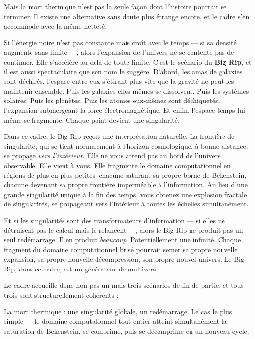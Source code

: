 \documentclass[11pt, twoside, openright]{book}
\begin{document}
Mais la mort thermique n'est pas la seule façon dont l'histoire pourrait se terminer. Il existe une alternative sans doute plus étrange encore, et le cadre s'en accommode avec la même netteté.

Si l'énergie noire n'est pas constante mais croît avec le temps --- si sa densité augmente sans limite ---, alors l'expansion de l'univers ne se contente pas de continuer. Elle s'accélère au-delà de toute limite. C'est le scénario du \textbf{Big Rip}, et il est aussi spectaculaire que son nom le suggère. D'abord, les amas de galaxies sont déchirés, l'espace entre eux s'étirant plus vite que la gravité ne peut les maintenir ensemble. Puis les galaxies elles-mêmes se dissolvent. Puis les systèmes solaires. Puis les planètes. Puis les atomes eux-mêmes sont déchiquetés, l'expansion submergeant la force électromagnétique. Et enfin, l'espace-temps lui-même se fragmente. Chaque point devient une singularité.

Dans ce cadre, le Big Rip reçoit une interprétation naturelle. La frontière de singularité, qui se tient normalement à l'horizon cosmologique, à bonne distance, se propage \textit{vers l'intérieur}. Elle ne vous attend pas au bord de l'univers observable. Elle vient à vous. Elle fragmente le domaine computationnel en régions de plus en plus petites, chacune saturant sa propre borne de Bekenstein, chacune devenant sa propre frontière imperméable à l'information. Au lieu d'une grande singularité unique à la fin des temps, vous obtenez une explosion fractale de singularités, se propageant vers l'intérieur à toutes les échelles simultanément.

Et si les singularités sont des transformateurs d'information --- si elles ne détruisent pas le calcul mais le relancent ---, alors le Big Rip ne produit pas un seul redémarrage. Il en produit \textit{beaucoup}. Potentiellement une infinité. Chaque fragment du domaine computationnel brisé pourrait semer sa propre nouvelle expansion, sa propre nouvelle décompression, son propre nouvel univers. Le Big Rip, dans ce cadre, est un générateur de multivers.

Le cadre accueille donc non pas un mais trois scénarios de fin de partie, et tous trois sont structurellement cohérents :

La mort thermique : une singularité globale, un redémarrage. Le cas le plus simple --- le domaine computationnel tout entier atteint simultanément la saturation de Bekenstein, se comprime, puis se décomprime en un nouveau cycle.
\end{document}
